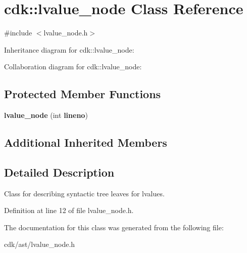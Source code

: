 \section{cdk\+:\+:lvalue\+\_\+node Class Reference}
\label{classcdk_1_1lvalue__node}


{\ttfamily \#include $<$lvalue\+\_\+node.\+h$>$}



Inheritance diagram for cdk\+:\+:lvalue\+\_\+node\+:


Collaboration diagram for cdk\+:\+:lvalue\+\_\+node\+:
\subsection*{Protected Member Functions}
\begin{DoxyCompactItemize}
\item 
\mbox{\label{classcdk_1_1lvalue__node_ae3f2020c806be939a87f9ae973030a0b}} 
{\bfseries lvalue\+\_\+node} (int \textbf{ lineno})
\end{DoxyCompactItemize}
\subsection*{Additional Inherited Members}


\subsection{Detailed Description}
Class for describing syntactic tree leaves for lvalues. 

Definition at line 12 of file lvalue\+\_\+node.\+h.



The documentation for this class was generated from the following file\+:\begin{DoxyCompactItemize}
\item 
cdk/ast/lvalue\+\_\+node.\+h\end{DoxyCompactItemize}
